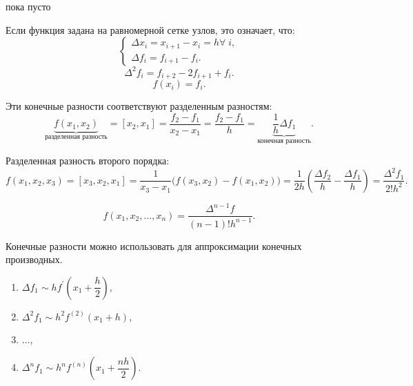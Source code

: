 \begin{col-answer-preambule}
	\begin{plan}
    \item пока пусто
	\end{plan}
\end{col-answer-preambule}


Если функция задана на равномерной сетке узлов, это означает, что:
\begin{equation*}
  \begin{cases}
    \Delta x_i = x_{i + 1} - x_i = h \forall \; i, \\
    \Delta f_i = f_{i+1} - f_i.
  \end{cases}
\end{equation*}
\begin{equation*}
  \Delta^2 f_i = f_{i+2} - 2 f_{i+1} + f_i.
\end{equation*}
\begin{equation*}
  f(x_i) = f_i.
\end{equation*}

Эти конечные разности соответствуют разделенным разностям:
\begin{equation*}
  \underbrace{f(x_1, x_2)}_{\text{разделенная разность}} = [x_2, x_1] = \dfrac{f_2 - f_1}{x_2 - x_1} = \dfrac{f_2 - f_1}{h} = \underbrace{\dfrac{1}{h} \Delta f_1}_{\text{конечная разность}}.
\end{equation*}

Разделенная разность второго порядка:
\begin{equation*}
  f(x_1, x_2, x_3) = [x_3, x_2, x_1] = \dfrac{1}{x_3 - x_1} \Big( f(x_3, x_2) - f(x_1, x_2) \Big) = \dfrac{1}{2h} \left(\dfrac{\Delta f_2}{h} - \dfrac{\Delta f_1}{h} \right) = \dfrac{\Delta^2 f_1}{2! h^2}.
\end{equation*}

\begin{equation*}
  f(x_1, x_2, \ldots, x_n) = \dfrac{\Delta^{n-1} f}{(n-1)! h^{n-1}}.
\end{equation*}

Конечные разности можно использовать для аппроксимации конечных производных.

\begin{enumerate}
  \item $\Delta f_1 \sim h f^{'} \left(x_1 + \dfrac{h}{2} \right),$
  \item $\Delta^2 f_1 \sim h^2 f^{(2)} (x_1 + h)$,
  \item $\ldots$,
  \item $\Delta^n f_1 \sim h^n f^{(n)} (x_1 + \dfrac{n h}{2}).$
\end{enumerate}

